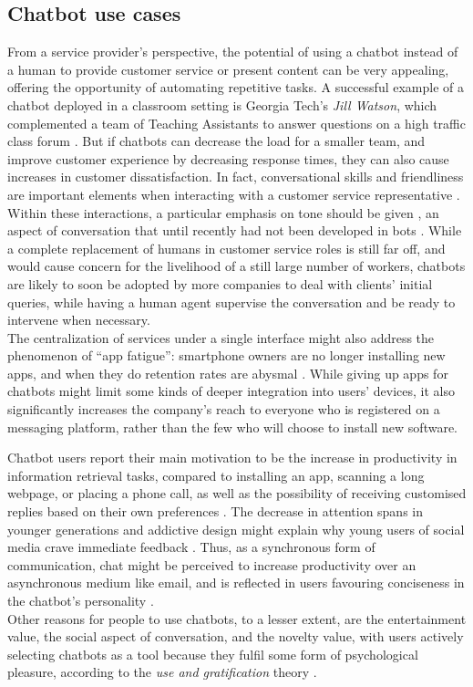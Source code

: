 \subsection{Chatbot use cases}
From a service provider's perspective, the potential of using a chatbot instead of a human to provide customer service or present content can be very appealing, offering the opportunity of automating repetitive tasks. A successful example of a chatbot deployed in a classroom setting is Georgia Tech's \textit{Jill Watson}, which complemented a team of Teaching Assistants to answer questions on a high traffic class forum \cite{Eicher2016}. But if chatbots can decrease the load for a smaller team, and improve customer experience by decreasing response times, they can also cause increases in customer dissatisfaction. In fact, conversational skills and friendliness are important elements when interacting with a customer service representative \cite{Kang2013}. Within these interactions, a particular emphasis on tone should be given \cite{morris1988many}, an aspect of conversation that until recently had not been developed in bots \cite{Hu2018}. While a complete replacement of humans in customer service roles is still far off, and would cause concern for the livelihood of a still large number of workers, chatbots are likely to soon be adopted by more companies to deal with clients' initial queries, while having a human agent supervise the conversation and be ready to intervene when necessary. \\
The centralization of services under a single interface might also address the phenomenon of ``app fatigue'': smartphone owners are no longer installing new apps, and when they do retention rates are abysmal \cite{appfatigue}. While giving up apps for chatbots might limit some kinds of deeper integration into users' devices, it also significantly increases the company's reach to everyone who is registered on a messaging platform, rather than the few who will choose to install new software. 

Chatbot users report their main motivation to be the increase in productivity in information retrieval tasks, compared to installing an app, scanning a long webpage, or placing a phone call, as well as the possibility of receiving customised replies based on their own preferences \cite{10.1007/978-3-319-70284-1_30}. The decrease in attention spans in younger generations \cite{Wilmer2017} and addictive design might explain why young users of social media crave immediate feedback \cite{brandtzaeg2016should}. Thus, as a synchronous form of communication, chat might be perceived to increase productivity over an asynchronous medium like email, and is reflected in users favouring conciseness in the chatbot's personality \cite{10.1007/978-3-319-67744-6_28}. \\
Other reasons for people to use chatbots, to a lesser extent, are the entertainment value, the social aspect of conversation, and the novelty value, with users actively selecting chatbots as a tool because they fulfil some form of psychological pleasure, according to the \textit{use and gratification} theory \cite{10.1007/978-3-319-70284-1_30}.
